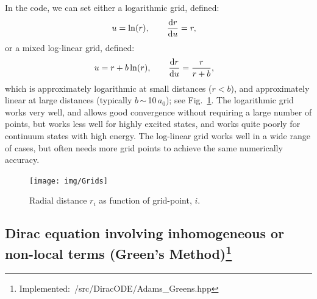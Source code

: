 \documentclass[10pt,twocolumn,a4paper]{article}%
\def\d{\ensuremath{{\rm d}}}
\begin{document}
In the code, we can set either a logarithmic grid, defined:
\begin{align}
u &= \ln(r), \qquad
\frac{\d r}{\d u} = r,
\end{align}
or a mixed log-linear grid, defined: 
\begin{align}
u &= r + b \ln(r), \qquad
\frac{\d r}{\d u} = \frac{r}{r + b},
\end{align}
which is approximately logarithmic at small distances ($r<b$), and approximately linear at large distances (typically $b$\,$\sim$\,10\,$a_0$); see Fig.~\ref{Fig:grids}.
The logarithmic grid works very well, and allows good convergence without requiring a large number of points, but works less well for highly excited states, and works quite poorly for continuum states with high energy.
The log-linear grid works well in a wide range of cases, but often needs more grid points to achieve the same numerically accuracy.



\begin{figure}
\centering
\texttt{[image: img/Grids]}
\caption{\small Radial distance $r_i$ as function of grid-point, $i$.\label{Fig:grids}}
\end{figure}



\subsection[Dirac equation involving inhomogeneous terms]{Dirac equation involving inhomogeneous or non-local terms (Green's Method)\footnote{Implemented:~/src/DiracODE/Adams\_Greens.hpp}}
\end{document}

